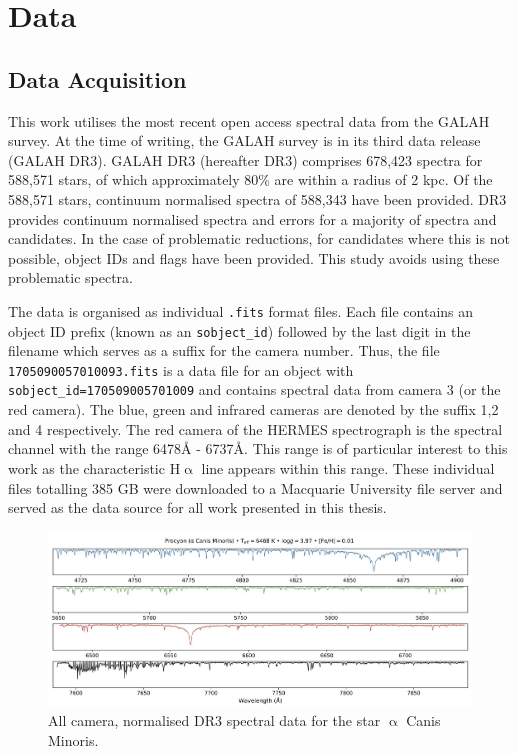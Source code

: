 \chapter{Data}

\section{Data Acquisition}

This work utilises the most recent open access spectral data from the GALAH survey. At the time of writing, the GALAH survey is in its third data release (GALAH DR3). GALAH DR3 (hereafter DR3) comprises 678,423 spectra for 588,571 stars, of which approximately 80\% are within a radius of 2 kpc\cite{buder2021galah+}. Of the 588,571 stars, continuum normalised spectra of 588,343 have been provided. DR3 provides continuum normalised spectra and errors for a majority of spectra and candidates. In the case of problematic reductions, for candidates where this is not possible, object IDs and flags have been provided. This study avoids using these problematic spectra.

The data is organised as individual \texttt{.fits} format files. Each file contains an object ID prefix (known as an \texttt{sobject\_id}) followed by the last digit in the filename which serves as a suffix for the camera number. Thus, the file \texttt{1705090057010093.fits} is a data file for an object with \texttt{sobject\_id=170509005701009} and contains spectral data from camera 3 (or the red camera). The blue, green and infrared cameras are denoted by the suffix 1,2 and 4 respectively.
The red camera of the HERMES spectrograph is the spectral channel with the range 6478\r{A} - 6737\r{A}\cite{sheinis2014first}. This range is of particular interest to this work as the characteristic H$\upalpha$ line appears within this range. These individual files totalling 385 GB were downloaded to a Macquarie University file server and served as the data source for all work presented in this thesis.

\begin{figure}[!htb]
\centering
\includegraphics[scale=.25]{figures/galah cameras.jpeg}
\caption{All camera, normalised DR3 spectral data for the star $\upalpha$ Canis Minoris.}
\end{figure}

